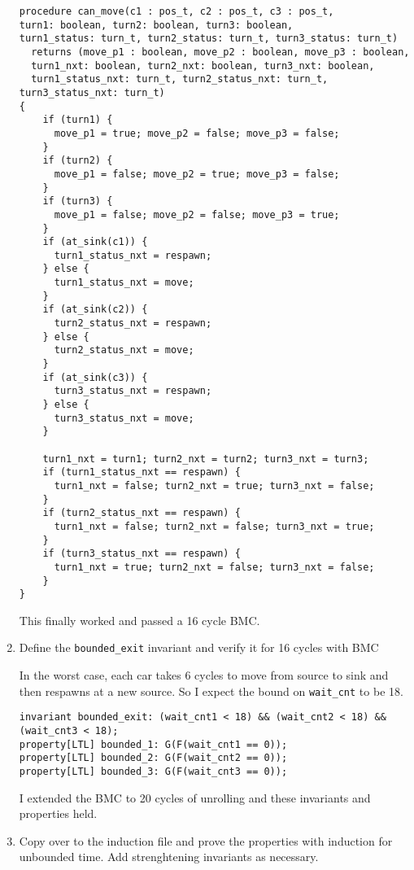\begin{enumerate}[label=(\alph*)]
\begin{verbatim}
procedure can_move(c1 : pos_t, c2 : pos_t, c3 : pos_t,
turn1: boolean, turn2: boolean, turn3: boolean,
turn1_status: turn_t, turn2_status: turn_t, turn3_status: turn_t)
  returns (move_p1 : boolean, move_p2 : boolean, move_p3 : boolean,
  turn1_nxt: boolean, turn2_nxt: boolean, turn3_nxt: boolean,
  turn1_status_nxt: turn_t, turn2_status_nxt: turn_t, turn3_status_nxt: turn_t)
{
    if (turn1) {
      move_p1 = true; move_p2 = false; move_p3 = false;
    }
    if (turn2) {
      move_p1 = false; move_p2 = true; move_p3 = false;
    }
    if (turn3) {
      move_p1 = false; move_p2 = false; move_p3 = true;
    }
    if (at_sink(c1)) {
      turn1_status_nxt = respawn;
    } else {
      turn1_status_nxt = move;
    }
    if (at_sink(c2)) {
      turn2_status_nxt = respawn;
    } else {
      turn2_status_nxt = move;
    }
    if (at_sink(c3)) {
      turn3_status_nxt = respawn;
    } else {
      turn3_status_nxt = move;
    }

    turn1_nxt = turn1; turn2_nxt = turn2; turn3_nxt = turn3;
    if (turn1_status_nxt == respawn) {
      turn1_nxt = false; turn2_nxt = true; turn3_nxt = false;
    }
    if (turn2_status_nxt == respawn) {
      turn1_nxt = false; turn2_nxt = false; turn3_nxt = true;
    }
    if (turn3_status_nxt == respawn) {
      turn1_nxt = true; turn2_nxt = false; turn3_nxt = false;
    }
}
    \end{verbatim}

    This finally worked and passed a 16 cycle BMC.

  \item {\color{blue}Define the \verb|bounded_exit| invariant and verify it for 16 cycles with BMC}

    In the worst case, each car takes 6 cycles to move from source to sink and then respawns at a new source. So I expect the bound on \verb|wait_cnt| to be 18.

    \begin{verbatim}
invariant bounded_exit: (wait_cnt1 < 18) && (wait_cnt2 < 18) && (wait_cnt3 < 18);
property[LTL] bounded_1: G(F(wait_cnt1 == 0));
property[LTL] bounded_2: G(F(wait_cnt2 == 0));
property[LTL] bounded_3: G(F(wait_cnt3 == 0));
    \end{verbatim}

    I extended the BMC to 20 cycles of unrolling and these invariants and properties held.

  \item {\color{blue}Copy over to the induction file and prove the properties with induction for unbounded time. Add strenghtening invariants as necessary.}


\end{enumerate}
